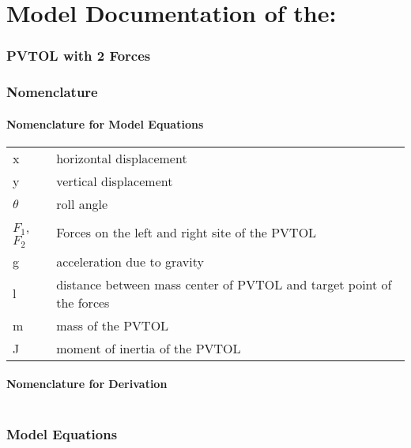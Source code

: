 \documentclass[10pt,a4paper]{article}
\begin{document}
	\part*{Model Documentation of the:}
	\section*{PVTOL with 2 Forces} %
	
	
	\section{Nomenclature} %
	\subsection{Nomenclature for Model Equations} %
	
	\begin{tabular}{ll}
		x & horizontal displacement \\
		y & vertical displacement \\
		$\theta$ & roll angle \\
		$F_1$, $F_2$ & Forces on the left and right site of the PVTOL \\
		g & acceleration due to gravity \\
		l & distance between mass center of PVTOL and target point of the forces \\
		m & mass of the PVTOL \\
		J & moment of inertia of the PVTOL		
	\end{tabular}
	
	\subsection{Nomenclature for Derivation} %
	
	\begin{tabular}{ll}
	\end{tabular}
	
	
	\section{Model Equations} %
	
\end{document}

